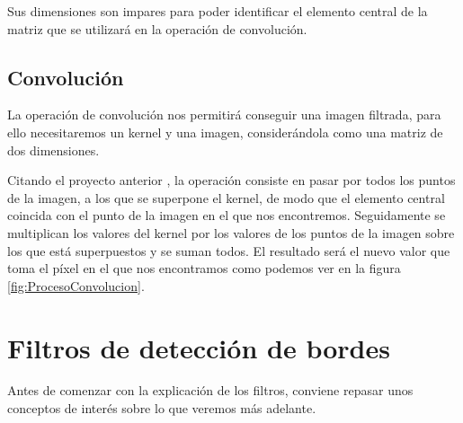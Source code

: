 Sus dimensiones son impares para poder identificar el elemento central de la matriz que se utilizará en la operación de convolución.

\subsection{Convolución} 
\label{ct:convolucion}
La operación de convolución nos permitirá conseguir una imagen filtrada, para ello necesitaremos un kernel y una imagen, considerándola como una matriz de dos dimensiones.

Citando el proyecto anterior \cite{perikymataV1}, la operación consiste en pasar por todos los puntos de la imagen, a los que se superpone el kernel, de modo que el elemento central coincida con el punto de la imagen en el que nos encontremos. Seguidamente se multiplican los valores del kernel por los valores de los puntos de la imagen sobre los que está superpuestos y se suman todos. El resultado será el nuevo valor que toma el píxel en el que nos encontramos como podemos ver en la figura \ref{fig:ProcesoConvolucion}.


\section{Filtros de detección de bordes}
Antes de comenzar con la explicación de los filtros, conviene repasar unos conceptos de interés sobre lo que veremos más adelante.

